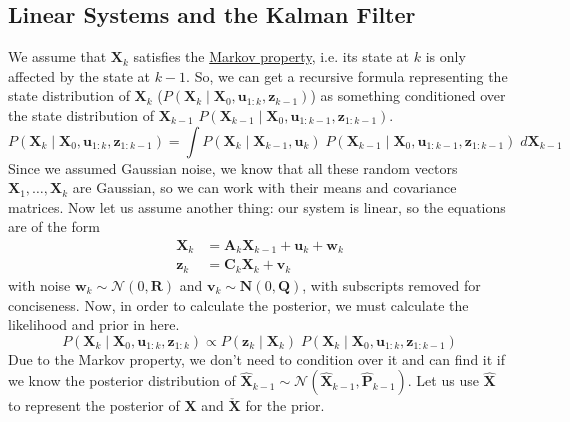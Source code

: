 \documentclass{article}
\begin{document}
  \subsection{Linear Systems and the Kalman Filter}
  We assume that $\mathbf{X}_k$ satisfies the \hyperref[sp-def:markov-property]{Markov property}, i.e. its state at $k$ is only affected by the state at $k-1$. So, we can get a recursive formula representing the state distribution of $\mathbf{X}_k$ ($P(\mathbf{X}_k \mid \mathbf{X}_0, \mathbf{u}_{1:k}, \mathbf{z}_{k-1})$) as something conditioned over the state distribution of $\mathbf{X}_{k-1}$ $P(\mathbf{X}_{k-1} \mid \mathbf{X}_0, \mathbf{u}_{1:k-1}, \mathbf{z}_{1:k-1})$. 
  \begin{equation}
    P(\mathbf{X}_k \mid \mathbf{X}_0, \mathbf{u}_{1:k}, \mathbf{z}_{1:k-1}) = \int P(\mathbf{X}_k \mid \mathbf{X}_{k-1}, \mathbf{u}_{k}) \; P (\mathbf{X}_{k-1} \mid \mathbf{X}_0, \mathbf{u}_{1:k-1}, \mathbf{z}_{1:k-1}) \; d \mathbf{X}_{k-1}
  \end{equation}
  Since we assumed Gaussian noise, we know that all these random vectors $\mathbf{X}_1, \ldots, \mathbf{X}_k$ are Gaussian, so we can work with their means and covariance matrices. Now let us assume another thing: our system is linear, so the equations are of the form 
  \begin{align*}
      \mathbf{X}_{k} & = \mathbf{A}_k \mathbf{X}_{k-1} + \mathbf{u}_k + \mathbf{w}_k \\
      \mathbf{z}_{k} & = \mathbf{C}_k \mathbf{X}_k + \mathbf{v}_{k}
  \end{align*}
  with noise $\mathbf{w}_k \sim \mathcal{N}(0, \mathbf{R})$ and $\mathbf{v}_{k} \sim \mathbf{N}(0, \mathbf{Q})$, with subscripts removed for conciseness. Now, in order to calculate the posterior, we must calculate the likelihood and prior in here. 
  \begin{equation}
    P (\mathbf{X}_k \mid \mathbf{X}_0, \mathbf{u}_{1:k}, \mathbf{z}_{1:k}) \propto P(\mathbf{z}_k \mid \mathbf{X}_k) \; P(\mathbf{X}_k \mid \mathbf{X}_0, \mathbf{u}_{1:k}, \mathbf{z}_{1:k-1})
  \end{equation}
  Due to the Markov property, we don't need to condition over it and can find it if we know the posterior distribution of $\hat{\mathbf{X}}_{k-1} \sim \mathcal{N}(\hat{\mathbf{X}}_{k-1}, \hat{\mathbf{P}}_{k-1})$. Let us use $\hat{\mathbf{X}}$ to represent the posterior of $\mathbf{X}$ and $\check{\mathbf{X}}$ for the prior. 
\end{document}
